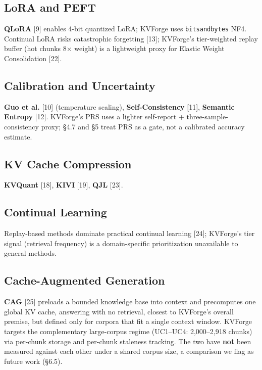 \hypertarget{lora-and-peft}{%
\subsection{LoRA and PEFT}\label{lora-and-peft}}

\textbf{QLoRA} {[}9{]} enables 4-bit quantized LoRA; KVForge uses \texttt{bitsandbytes} NF4. Continual LoRA risks catastrophic forgetting {[}13{]}; KVForge's tier-weighted replay buffer (hot chunks 8× weight) is a lightweight proxy for Elastic Weight Consolidation {[}22{]}.

\hypertarget{calibration-and-uncertainty}{%
\subsection{Calibration and Uncertainty}\label{calibration-and-uncertainty}}

\textbf{Guo et al.} {[}10{]} (temperature scaling), \textbf{Self-Consistency} {[}11{]}, \textbf{Semantic Entropy} {[}12{]}. KVForge's PRS uses a lighter self-report + three-sample-consistency proxy; §4.7 and §5 treat PRS as a gate, not a calibrated accuracy estimate.

\hypertarget{kv-cache-compression}{%
\subsection{KV Cache Compression}\label{kv-cache-compression}}

\textbf{KVQuant} {[}18{]}, \textbf{KIVI} {[}19{]}, \textbf{QJL} {[}23{]}.

\hypertarget{continual-learning}{%
\subsection{Continual Learning}\label{continual-learning}}

Replay-based methods dominate practical continual learning {[}24{]}; KVForge's tier signal (retrieval frequency) is a domain-specific prioritization unavailable to general methods.

\hypertarget{cache-augmented-generation}{%
\subsection{Cache-Augmented Generation}\label{cache-augmented-generation}}

\textbf{CAG} {[}25{]} preloads a bounded knowledge base into context and precomputes one global KV cache, answering with no retrieval, closest to KVForge's overall premise, but defined only for corpora that fit a single context window. KVForge targets the complementary large-corpus regime (UC1--UC4: 2,000--2,918 chunks) via per-chunk storage and per-chunk staleness tracking. The two have \textbf{not} been measured against each other under a shared corpus size, a comparison we flag as future work (§6.5).

